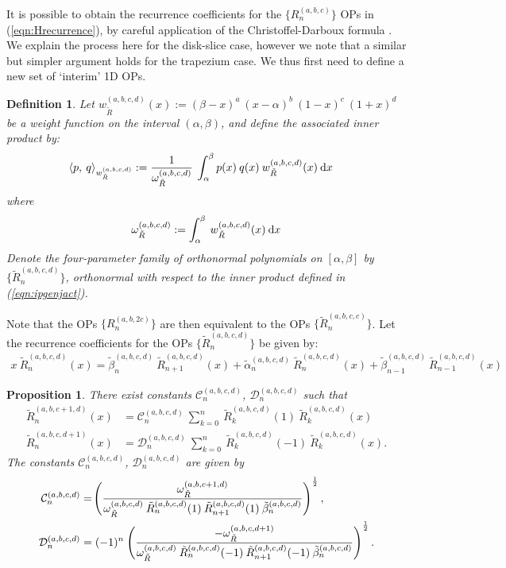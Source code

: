 \documentclass[11pt, oneside]{article}   	%
\newcommand{\half}{\frac{1}{2}}
\newcommand{\genjac}{R}
\newcommand{\genjact}{\tilde{\genjac}}
\newcommand{\genjactw}{w_{\genjact}}
\newcommand{\normgenjact}{\omega_{\genjact}}
\newtheorem{proposition}{Proposition}
\newtheorem{definition}{Definition}
\begin{document}
It is possible to obtain the recurrence coefficients for the $\{\genjac_n^{(a,b,c)}\}$ OPs in (\ref{eqn:Hrecurrence}), by careful application of the Christoffel-Darboux formula \cite[18.2.12]{DLMF}. We explain the process here for the disk-slice case, however we note that a similar but simpler argument holds for the trapezium case. We thus first need to define a new set of `interim' 1D OPs.
\begin{definition}\label{def:InterimOPconstruction}
Let $\genjactw^{(a,b,c,d)}(x) := (\beta - x)^a \: (x - \alpha)^{b} \: (1-x)^{c} \: (1+x)^{d} $ be a weight function on the interval $(\alpha, \beta)$, and define the associated inner product by:
\begin{align}
	\ip< p, \: q >_{\genjactw^{(a,b,c,d)}} &:= \frac{1}{\normgenjact^{(a,b,c,d)}} \: \int_\alpha^\beta p(x) \: q(x) \: \genjactw^{(a,b,c,d)}(x) \: \D x \label{eqn:ipgenjact}
\end{align}
where
\begin{align}
	\normgenjact^{(a,b,c,d)} := \int_\alpha^\beta \: \genjactw^{(a,b,c,d)}(x) \: \D x
\end{align}
Denote the four-parameter family of orthonormal polynomials on $[\alpha,\beta]$ by $\{\genjact_n^{(a,b,c,d)}\}$, orthonormal with respect to the inner product defined in (\ref{eqn:ipgenjact}).
\end{definition}
Note that the OPs $\{\genjac_n^{(a,b,2c)}\}$ are then equivalent to the OPs $\{\genjact_n^{(a,b,c,c)}\}$. Let the recurrence coefficients for the OPs $\{\genjact_n^{(a,b,c,d)}\}$ be given by:
\begin{align}
	x \: \genjact_n^{(a,b,c,d)}(x) = \tilde{\beta}_n^{(a,b,c,d)} \: \genjact_{n+1}^{(a,b,c,d)}(x) + \tilde{\alpha}_n^{(a,b,c,d)} \:\genjact_n^{(a,b,c,d)}(x) + \tilde{\beta}_{n-1}^{(a,b,c,d)} \: \genjact_{n-1}^{(a,b,c,d)}(x)
\end{align}
\begin{proposition}
There exist constants $\mathcal{C}_n^{(a,b,c,d)}$, $\mathcal{D}_n^{(a,b,c,d)}$ such that
\begin{align}
	\genjact_n^{(a,b,c+1,d)}(x) &= \mathcal{C}_n^{(a,b,c,d)} \: \sum_{k=0}^n \: \genjact_{k}^{(a,b,c,d)}(1) \: \genjact_{k}^{(a,b,c,d)}(x) \label{eqn:genjacexpansioni} \\
	\genjact_n^{(a,b,c,d+1)}(x) &= \mathcal{D}_n^{(a,b,c,d)} \: \sum_{k=0}^n \: \genjact_{k}^{(a,b,c,d)}(-1) \: \genjact_{k}^{(a,b,c,d)}(x). \label{eqn:genjacexpansionii}
\end{align}
The constants $\mathcal{C}_n^{(a,b,c,d)}$, $\mathcal{D}_n^{(a,b,c,d)}$ are given by
\begin{align}
	\mathcal{C}_n^{(a,b,c,d)} &= \fpr(\frac{\normgenjact^{(a,b,c+1,d)}}{\normgenjact^{(a,b,c,d)} \: \genjact_n^{(a,b,c,d)}(1) \: \genjact_{n+1}^{(a,b,c,d)}(1) \: \tilde{\beta}_n^{(a,b,c,d)}})^\half, \label{eqn:genjactnormalisationi} \\
	\mathcal{D}_n^{(a,b,c,d)} &= (-1)^n \: \fpr(\frac{- \normgenjact^{(a,b,c,d+1)}}{\normgenjact^{(a,b,c,d)} \: \genjact_n^{(a,b,c,d)}(-1) \: \genjact_{n+1}^{(a,b,c,d)}(-1) \: \tilde{\beta}_n^{(a,b,c,d)}})^\half. \label{eqn:genjactnormalisationii}
\end{align}
\end{proposition}
\end{document}
